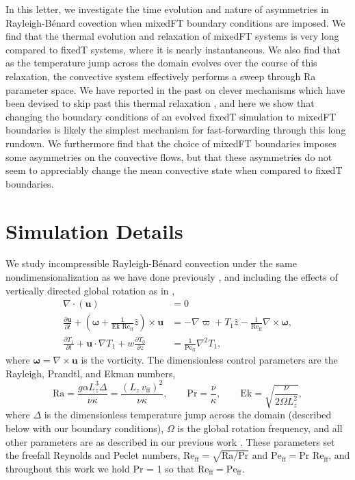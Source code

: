 \documentclass[aps, pre, onecolumn, nofootinbib, notitlepage, groupedaddress, amsfonts, amssymb, amsmath, longbibliography]{revtex4-1}
\newcommand{\Div}[1]{\ensuremath{\nabla\cdot\left( #1\right)}}
\newcommand{\grad}{\ensuremath{\nabla}}
\newcommand{\RB}{Rayleigh-B\'{e}nard }
\newcommand{\Reff}{\ensuremath{\text{Re}_{\text{ff}}}}
\newcommand{\Peff}{\ensuremath{\text{Pe}_{\text{ff}}}}
\begin{document}
In this letter, we investigate the time evolution and nature of asymmetries in \RB covection when mixedFT boundary conditions are imposed.
We find that the thermal evolution and relaxation of mixedFT systems is very long compared to fixedT systems, where it is nearly instantaneous.
We also find that as the temperature jump across the domain evolves over the course of this relaxation, the convective system effectively performs a sweep through Ra parameter space.
We have reported in the past on clever mechanisms which have been devised to skip past this thermal relaxation \cite{anders&all2018}, and here we show that changing the boundary conditions of an evolved fixedT simulation to mixedFT boundaries is likely the simplest mechanism for fast-forwarding through this long rundown.
We furthermore find that the choice of mixedFT boundaries imposes some asymmetries on the convective flows, but that these asymmetries do not seem to appreciably change the mean convective state when compared to fixedT boundaries.


\section{Simulation Details}
\label{sec:simulations}
We study incompressible \RB convection under the same nondimensionalization as we have done previously \cite{anders&all2018}, and including the effects of vertically directed global rotation as in \cite{julien&all1996},
\begin{align}
\Div{\bm{u}} &= 0
	\label{eqn:incompressible}
\\
\frac{\partial \bm{u}}{\partial t} + \left(\bm{\omega} + \frac{1}{\text{Ek }\Reff}\hat{z}\right)\times\bm{u} 
&= - \grad \varpi + T_1\hat{z} - \frac{1}{\Reff}\grad\times\bm{\omega},
	\label{eqn:bouss_momentum}
\\
\frac{\partial T_1}{\partial t}  + \bm{u}\cdot\grad T_1 + w \frac{\partial T_0}{\partial z} 
&= \frac{1}{\Peff}\grad^2 T_1,
	\label{eqn:bouss_energy}
\end{align}
where $\bm{\omega} = \grad \times \bm{u}$ is the vorticity.
The dimensionless control parameters are the Rayleigh, Prandtl, and Ekman numbers,
\begin{equation}
\text{Ra} = \frac{g \alpha L_z^3 \Delta}{\nu\kappa} = \frac{(L_z\,v_{\text{ff}})^2}{\nu\kappa}, \qquad \text{Pr} = \frac{\nu}{\kappa}, \qquad \text{Ek} = \sqrt{\frac{\nu}{2\Omega L_z^2}},
\end{equation}
where $\Delta$ is the dimensionless temperature jump across the domain (described below with our boundary conditions), $\Omega$ is the global rotation frequency, and all other parameters are as described in our previous work \cite{anders&all2018}.
These parameters set the freefall Reynolds and Peclet numbers, $\Reff = \sqrt{\text{Ra}/\text{Pr}}$ and $\Peff = \text{Pr }\Reff$, and throughout this work we hold Pr = 1 so that $\Reff = \Peff$.
\end{document}
